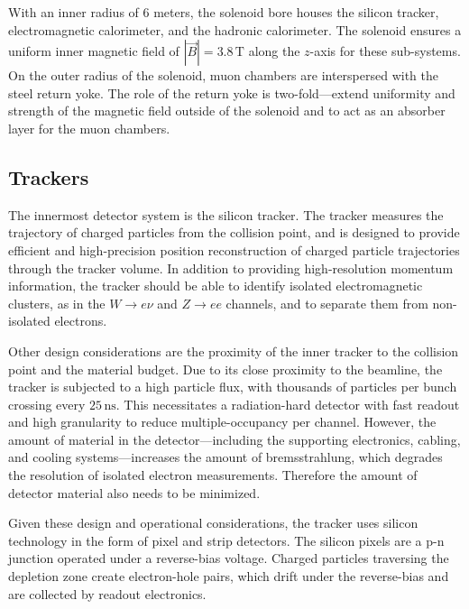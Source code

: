 
With an inner radius of 6 meters, the solenoid bore houses the silicon tracker, electromagnetic calorimeter, and the hadronic calorimeter. The solenoid ensures a uniform inner magnetic field of $|\vec{B}| = 3.8 \,\mathrm{T}$ along the $z$-axis for these sub-systems. On the outer radius of the solenoid, muon chambers are interspersed with the steel return yoke. The role of the return yoke is two-fold---extend uniformity and strength of the magnetic field outside of the solenoid and to act as an absorber layer for the muon chambers. 

\subsection{Trackers}\label{ch:cms:tracker}
The innermost detector system is the silicon tracker. The tracker measures the trajectory of charged particles from the collision point, and is designed to provide efficient and high-precision position reconstruction of charged particle trajectories through the tracker volume. In addition to providing high-resolution momentum information, the tracker should be able to identify isolated electromagnetic clusters, as in the $W\rightarrow e\nu$ and $Z \rightarrow ee$ channels, and to separate them from non-isolated electrons\cite{Karimaki:368412}.

Other design considerations are the proximity of the inner tracker to the collision point and the material budget. Due to its close proximity to the beamline, the tracker is subjected to a high particle flux, with thousands of particles per bunch crossing every $25\,\mathrm{ns}$. This necessitates a radiation-hard detector with fast readout and high granularity to reduce multiple-occupancy per channel. However, the amount of material in the detector---including the supporting electronics, cabling, and cooling systems---increases the amount of bremsstrahlung, which degrades the resolution of isolated electron measurements. Therefore the amount of detector material also needs to be minimized.

Given these design and operational considerations, the tracker uses silicon technology in the form of pixel and strip detectors. The silicon pixels are a p-n junction operated under a reverse-bias voltage. Charged particles traversing the depletion zone create electron-hole pairs, which drift under the reverse-bias and are collected by readout electronics.

